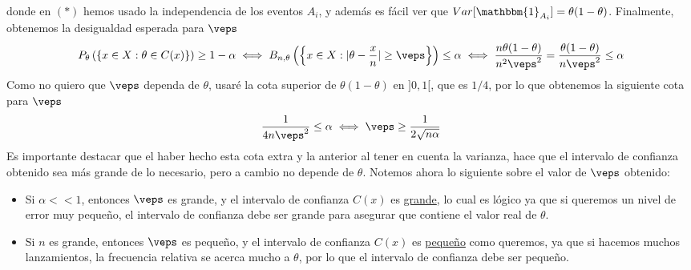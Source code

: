donde en $(*)$ hemos usado la independencia de los eventos $A_i$, y además es fácil ver que \mbox{$Var[\mathbbm{1}_{A_i}] = \theta(1-\theta)$}. Finalmente, obtenemos la desigualdad esperada para $\veps$
\begin{align*}
    P_{\theta}\left(\left\{x \in X : \theta \in C(x)\right\}\right)\geq 1-\alpha \iff B_{n,\theta}\left(\left\{x \in X : |\theta - \dfrac{x}{n}| \geq \veps\right\}\right) \leq \alpha \iff \dfrac{n \theta(1-\theta)}{n^2 \veps^2}=\dfrac{\theta(1-\theta)}{n \veps^2} \leq \alpha 
\end{align*}
Como no quiero que $\veps$ dependa de $\theta$, usaré la cota superior de $\theta(1-\theta)$ en $]0,1[$, que es $1/4$, por lo que obtenemos la siguiente cota para $\veps$
\begin{equation*}
    \dfrac{1}{4 n \veps^2} \leq \alpha \iff \veps \geq \dfrac{1}{2 \sqrt{n \alpha}}
\end{equation*}
Es importante destacar que el haber hecho esta cota extra y la anterior al tener en cuenta la varianza, hace que el intervalo de confianza obtenido sea más grande de lo necesario, pero a cambio no depende de $\theta$. Notemos ahora lo siguiente sobre el valor de $\veps$ obtenido:
\begin{itemize}
    \item Si $\alpha << 1$, entonces $\veps$ es grande, y el intervalo de confianza $C(x)$ es \underline{grande}, lo cual es lógico ya que si queremos un nivel de error muy pequeño, el intervalo de confianza debe ser grande para asegurar que contiene el valor real de $\theta$.
    \item Si $n$ es grande, entonces $\veps$ es pequeño, y el intervalo de confianza $C(x)$ es \underline{pequeño} como queremos, ya que si hacemos muchos lanzamientos, la frecuencia relativa se acerca mucho a $\theta$, por lo que el intervalo de confianza debe ser pequeño.
\end{itemize}


